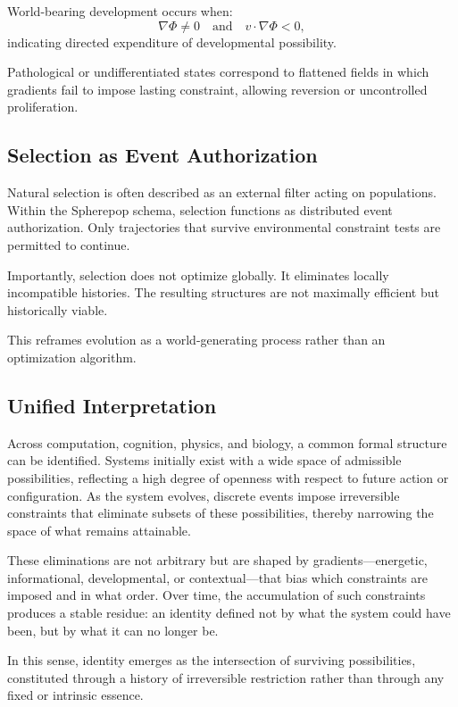 \documentclass[11pt]{article}
\begin{document}
World-bearing development occurs when:
\[
\nabla \Phi \neq 0 \quad \text{and} \quad v \cdot \nabla \Phi < 0,
\]
indicating directed expenditure of developmental possibility.

Pathological or undifferentiated states correspond to flattened fields in which gradients fail to impose lasting constraint, allowing reversion or uncontrolled proliferation.

\subsection{Selection as Event Authorization}

Natural selection is often described as an external filter acting on populations. Within the Spherepop schema, selection functions as distributed event authorization. Only trajectories that survive environmental constraint tests are permitted to continue.

Importantly, selection does not optimize globally. It eliminates locally incompatible histories. The resulting structures are not maximally efficient but historically viable.

This reframes evolution as a world-generating process rather than an optimization algorithm.
\subsection{Unified Interpretation}

Across computation, cognition, physics, and biology, a common formal structure can be identified. Systems initially exist with a wide space of admissible possibilities, reflecting a high degree of openness with respect to future action or configuration. As the system evolves, discrete events impose irreversible constraints that eliminate subsets of these possibilities, thereby narrowing the space of what remains attainable.

These eliminations are not arbitrary but are shaped by gradients—energetic, informational, developmental, or contextual—that bias which constraints are imposed and in what order. Over time, the accumulation of such constraints produces a stable residue: an identity defined not by what the system could have been, but by what it can no longer be.

In this sense, identity emerges as the intersection of surviving possibilities, constituted through a history of irreversible restriction rather than through any fixed or intrinsic essence.
\end{document}
